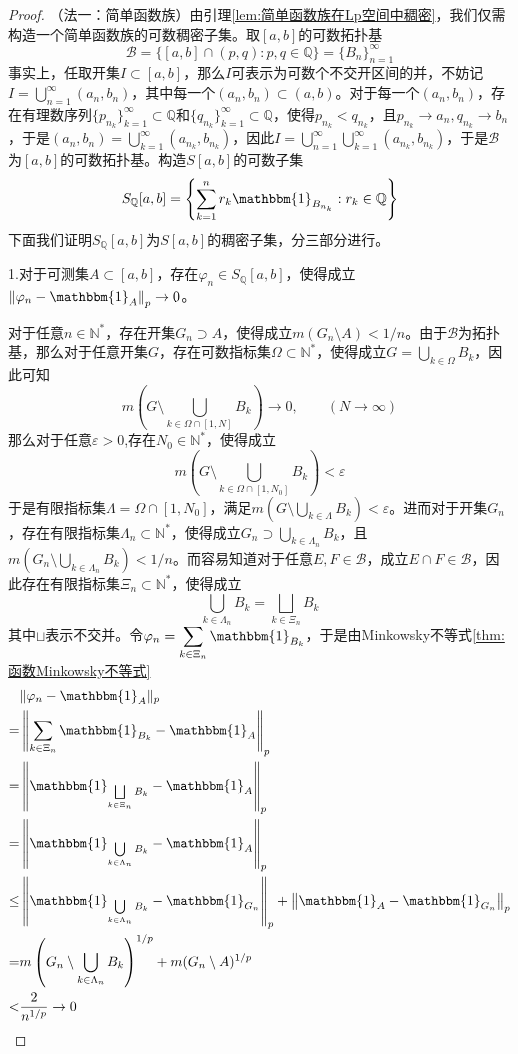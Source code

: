 \documentclass[lang = cn, scheme = chinese, thmcnt = section]{elegantbook}
\begin{document}
\begin{proof}
	（法一：简单函数族）由引理\ref{lem:简单函数族在Lp空间中稠密}，我们仅需构造一个简单函数族的可数稠密子集。取$[a,b]$的可数拓扑基
	$$
	\mathscr{B}=\{ [a,b]\cap (p,q):p,q\in\mathbb{Q} \}=\{B_n\}_{n=1}^{\infty}
	$$
	事实上，任取开集$I\subset[a,b]$，那么$I$可表示为可数个不交开区间的并，不妨记$\displaystyle I=\bigcup_{n=1}^{\infty}(a_n,b_n)$，其中每一个$(a_n,b_n)\subset (a,b)$。对于每一个$(a_n,b_n)$，存在有理数序列$\{p_{n_k}\}_{k=1}^{\infty}\subset \mathbb{Q}$和$\{q_{n_k}\}_{k=1}^{\infty}\subset \mathbb{Q}$，使得$p_{n_k}<q_{n_k}$，且$p_{n_k}\to a_n,q_{n_k}\to b_n$，于是$\displaystyle (a_n,b_n)=\bigcup_{k=1}^{\infty}(a_{n_k},b_{n_k})$，因此$\displaystyle I=\bigcup_{n=1}^{\infty}\bigcup_{k=1}^{\infty}(a_{n_k},b_{n_k})$，于是$\mathscr{B}$为$[a,b]$的可数拓扑基。构造$S[a,b]$的可数子集
	$$
	S_{\mathbb{Q}}[a,b]=\left\{ \sum_{k=1}^{n}r_k\mathbbm{1}_{B_{n_k}}:r_k\in \mathbb{Q} \right\}
	$$
	下面我们证明$S_{\mathbb{Q} }[a,b]$为$S[a,b]$的稠密子集，分三部分进行。
	
	1.对于可测集$A\subset [a,b]$，存在$\varphi_n\in S_\mathbb{Q}[a,b]$，使得成立$\left\| \varphi_n-\mathbbm{1}_{A} \right\|_p\to0$。
	
	对于任意$n\in\mathbb{N}^*$，存在开集$G_n\supset A$，使得成立$m(G_n\setminus A)<1/n$。由于$\mathscr{B}$为拓扑基，那么对于任意开集$G$，存在可数指标集$\Omega\subset \mathbb{N}^*$，使得成立$\displaystyle G=\bigcup_{k\in\Omega}B_k$，因此可知
	$$
	m\left(G\setminus \bigcup_{k\in\Omega\cap[1,N]}B_k\right)\to 0,\qquad (N\to\infty)
	$$
	那么对于任意$\varepsilon>0$,存在$N_0\in\mathbb{N}^*$，使得成立
	$$
	m\left(G\setminus \bigcup_{k\in\Omega\cap[1,N_0]}B_k\right)<\varepsilon
	$$
	于是有限指标集$\Lambda=\Omega\cap[1,N_0]$，满足$m(G\setminus\bigcup_{k\in\Lambda}B_k)<\varepsilon$。进而对于开集$G_n$，存在有限指标集$\Lambda_n\subset\mathbb{N}^*$，使得成立$G_n\supset\bigcup_{k\in\Lambda_n}B_k$，且$m(G_n\setminus\bigcup_{k\in\Lambda_n}B_k)<1/n$。而容易知道对于任意$E,F\in\mathscr{B}$，成立$E\cap F\in\mathscr{B}$，因此存在有限指标集$\Xi_n\subset\mathbb{N}^*$，使得成立
	$$
	\bigcup_{k\in\Lambda_n}B_k=\bigsqcup_{k\in\Xi_n}B_k
	$$
	其中$\sqcup$表示不交并。令$\displaystyle \varphi_n=\sum_{k\in\Xi_n}\mathbbm{1}_{B_k}$，于是由Minkowsky不等式\ref{thm:函数Minkowsky不等式}
	\begin{align*}
		& \| \varphi_n-\mathbbm{1}_{A}\|_p\\
		= &\left\| \sum_{k\in\Xi_n}\mathbbm{1}_{B_k}-\mathbbm{1}_{A} \right\|_p\\
		= &\left\| \mathbbm{1}_{\bigsqcup\limits_{k\in\Xi_n}B_k}-\mathbbm{1}_{A} \right\|_p\\
		= &\left\| \mathbbm{1}_{\bigcup\limits_{k\in\Lambda_n}B_k}-\mathbbm{1}_{A} \right\|_p\\
		\le & \left\| \mathbbm{1}_{\bigcup\limits_{k\in\Lambda_n}B_k}-\mathbbm{1}_{G_n} \right\|_p+\left\| \mathbbm{1}_{A}-\mathbbm{1}_{G_n} \right\|_p\\
		=&m\left(G_n\setminus\bigcup_{k\in\Lambda_n}B_k\right)^{1/p}+m(G_n\setminus A)^{1/p}\\
		<&\frac{2}{n^{1/p}}\to0
	\end{align*}
	

\end{proof}
\end{document}
